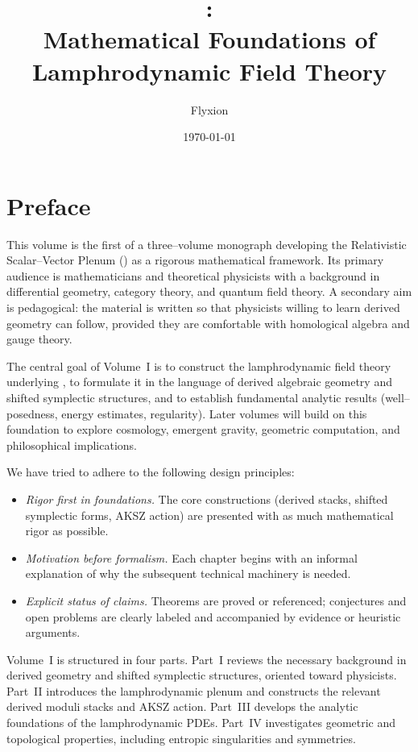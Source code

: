 \documentclass[11pt]{book}
\title{\rsvptitle:\\
Mathematical Foundations of Lamphrodynamic Field Theory}
\author{Flyxion}
\date{\today}
\begin{document}
\frontmatter
\maketitle

\chapter*{Preface}

This volume is the first of a three--volume monograph developing the
Relativistic Scalar--Vector Plenum (\rsvpabbr{}) as a rigorous mathematical
framework. Its primary audience is mathematicians and theoretical physicists
with a background in differential geometry, category theory, and quantum field
theory. A secondary aim is pedagogical: the material is written so that
physicists willing to learn derived geometry can follow, provided they are
comfortable with homological algebra and gauge theory.

The central goal of Volume~I is to construct the lamphrodynamic field theory
underlying \rsvpabbr{}, to formulate it in the language of derived algebraic
geometry and shifted symplectic structures, and to establish fundamental
analytic results (well--posedness, energy estimates, regularity). Later volumes
will build on this foundation to explore cosmology, emergent gravity, geometric
computation, and philosophical implications.

We have tried to adhere to the following design principles:
\begin{itemize}
  \item \emph{Rigor first in foundations.} The core constructions (derived
  stacks, shifted symplectic forms, AKSZ action) are presented with as much
  mathematical rigor as possible.

  \item \emph{Motivation before formalism.} Each chapter begins with an
  informal explanation of why the subsequent technical machinery is needed.

  \item \emph{Explicit status of claims.} Theorems are proved or referenced;
  conjectures and open problems are clearly labeled and accompanied by
  evidence or heuristic arguments.
\end{itemize}

Volume~I is structured in four parts. Part~I reviews the necessary background
in derived geometry and shifted symplectic structures, oriented toward
physicists. Part~II introduces the lamphrodynamic plenum and constructs the
relevant derived moduli stacks and AKSZ action. Part~III develops the analytic
foundations of the lamphrodynamic PDEs. Part~IV investigates geometric and
topological properties, including entropic singularities and symmetries.
\end{document}
